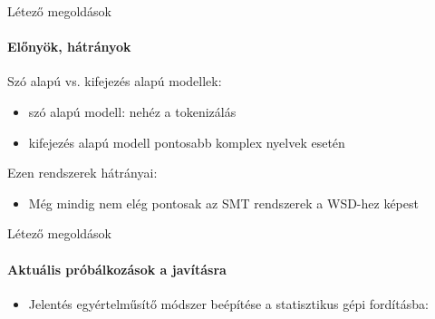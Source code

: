 \begin{frame}{Létező megoldások}
	\framesubtitle{Előnyök, hátrányok}
	
	Szó alapú vs. kifejezés alapú modellek: 
	\begin{itemize}
		\item
			szó alapú modell: nehéz a tokenizálás \cite{Lopez07asurvey}
		\item
			kifejezés alapú modell pontosabb komplex nyelvek esetén \cite{Lopez07asurvey}
		
	\end{itemize}
	
	Ezen rendszerek hátrányai:
	\begin{itemize}
		\item
			Még mindig nem elég pontosak az SMT rendszerek a WSD-hez képest \cite{Carpuat_evaluatingthe}
	\end{itemize}
	
\end{frame}


\begin{frame}{Létező megoldások}
	\framesubtitle{Aktuális próbálkozások a javításra}
	
	\begin{itemize}
		\item
			Jelentés egyértelműsítő módszer beépítése a statisztikus gépi fordításba: \cite{carpuat2005} \cite{Carpuat07improvingstatistical}
	\end{itemize}
\end{frame}


